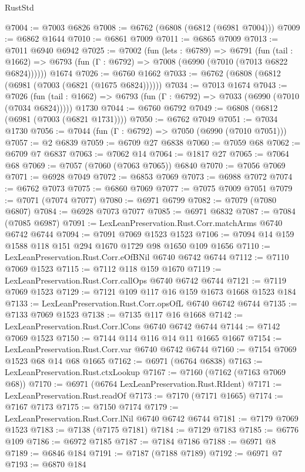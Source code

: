 \begin{lexlean}{RustStd}
\begin{coremodule}
{\begin{coremodule}
{{{{{{{{{{{{{{{{{{{{{{{{{{{{{{{{{{{{{{{{{{{{@7004 := @7003 @6826
@7008 := @6762 (@6808 (@6812 (@6981 @7004)))
@7009 := @6862 @1644
@7010 := @6861 @7009
@7011 := @6865 @7009
@7013 := @7011 @6940 @6942
@7025 := @7002
    (fun (lets : @6789) =>
    @6791
      (fun (tail : @1662) => @6793 (fun (Γ : @6792) => @7008 (@6990 (@7010 (@7013 @6822 @6824))))))
    @1674
@7026 := @6760 @1662
@7033 := @6762 (@6808 (@6812 (@6981 (@7003 (@6821 (@1675 @6824))))))
@7034 := @7013 @1674
@7043 := @7026
    (fun (tail : @1662) => @6793 (fun (Γ : @6792) => @7033 (@6990 (@7010 (@7034 @6824)))))
    @1730
@7044 := @6760 @6792
@7049 := @6808 (@6812 (@6981 (@7003 (@6821 @1731))))
@7050 := @6762 @7049
@7051 := @7034 @1730
@7056 := @7044 (fun (Γ : @6792) => @7050 (@6990 (@7010 @7051)))
@7057 := @2 @6839
@7059 := @6709 @27 @6838
@7060 := @7059 @68
@7062 := @6709 @7 @6837
@7063 := @7062 @14
@7064 := @1817 @27
@7065 := @7064 @68
@7069 := @7057 (@7060 (@7063 @7065)) @6840
@7070 := @7056 @7069
@7071 := @6928 @7049
@7072 := @6853 @7069
@7073 := @6988 @7072
@7074 := @6762 @7073
@7075 := @6860 @7069
@7077 := @7075 @7009 @7051
@7079 := @7071 (@7074 @7077)
@7080 := @6971 @6799
@7082 := @7079 (@7080 @6807)
@7084 := @6928 @7073 @7077
@7085 := @6971 @6832
@7087 := @7084 (@7085 @6987)
@7091 := LexLeanPreservation.Rust.Corr.matchArms @6740 @6742 @6744
@7094 := @7091 @7069 @1523 @1523
@7106 := @7094 @14 @159 @1588 @118 @151 @294 @1670 @1729 @98 @1650 @109 @1656
@7110 := LexLeanPreservation.Rust.Corr.eOfBNil @6740 @6742 @6744
@7112 := @7110 @7069 @1523
@7115 := @7112 @118 @159 @1670
@7119 := LexLeanPreservation.Rust.Corr.callOps @6740 @6742 @6744
@7121 := @7119 @7069 @1523
@7129 := @7121 @109 @117 @16 @159 @1673 @1668 @1523 @184
@7133 := LexLeanPreservation.Rust.Corr.opsOfL @6740 @6742 @6744
@7135 := @7133 @7069 @1523
@7138 := @7135 @117 @16 @1668
@7142 := LexLeanPreservation.Rust.Corr.lCons @6740 @6742 @6744
@7144 := @7142 @7069 @1523
@7150 := @7144 @114 @116 @14 @11 @1665 @1667
@7154 := LexLeanPreservation.Rust.Corr.var @6740 @6742 @6744
@7160 := @7154 @7069 @1523 @68 @14 @68 @1665
@7162 := @6971 (@6764 @6838)
@7163 := LexLeanPreservation.Rust.ctxLookup
@7167 := @7160 (@7162 (@7163 @7069 @68))
@7170 := @6971 (@6764 LexLeanPreservation.Rust.RIdent)
@7171 := LexLeanPreservation.Rust.readOf
@7173 := @7170 (@7171 @1665)
@7174 := @7167 @7173
@7175 := @7150 @7174
@7179 := LexLeanPreservation.Rust.Corr.lNil @6740 @6742 @6744
@7181 := @7179 @7069 @1523
@7183 := @7138 (@7175 @7181)
@7184 := @7129 @7183
@7185 := @6776 @109
@7186 := @6972 @7185
@7187 := @7184 @7186
@7188 := @6971 @8
@7189 := @6846 @184
@7191 := @7187 (@7188 @7189)
@7192 := @6971 @7
@7193 := @6870 @184
}}}}}}}}}}}}}}}}}}}}}}}}}}}}}}}}}}}}}}}}}}}}
\end{coremodule}}
\end{coremodule}
\end{lexlean}
